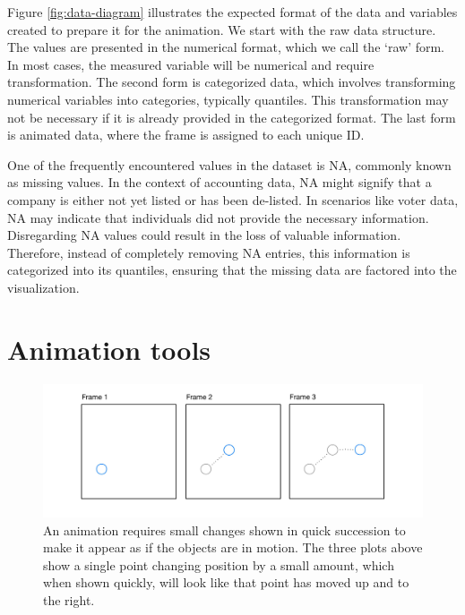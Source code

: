 Figure \ref{fig:data-diagram} illustrates the expected format of the data and variables created to prepare it for the animation. We start with the raw data structure. The values are presented in the numerical format, which we call the `raw' form. In most cases, the measured variable will be numerical and require transformation. The second form is categorized data, which involves transforming numerical variables into categories, typically quantiles. This transformation may not be necessary if it is already provided in the categorized format. The last form is animated data, where the frame is assigned to each unique ID.

One of the frequently encountered values in the dataset is NA, commonly known as missing values. In the context of accounting data, NA might signify that a company is either not yet listed or has been de-listed. In scenarios like voter data, NA may indicate that individuals did not provide the necessary information. Disregarding NA values could result in the loss of valuable information. Therefore, instead of completely removing NA entries, this information is categorized into its quantiles, ensuring that the missing data are factored into the visualization.

\hypertarget{animation}{%
\section{Animation tools}\label{animation}}

\begin{figure}

{\centering \includegraphics[width=1\linewidth]{figures/animation-diagram} 

}

\caption{An animation requires small changes shown in quick succession to make it appear as if the objects are in motion. The three plots above show a single point changing position by a small amount, which when shown quickly, will look like that point has moved up and to the right.}\label{fig:animation-diagram}
\end{figure}

